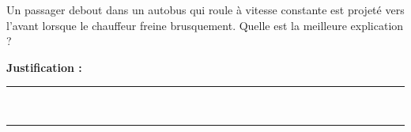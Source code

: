 Un passager debout dans un autobus qui roule à vitesse constante est projeté vers l'avant lorsque le chauffeur freine brusquement. Quelle est la meilleure explication ?

\choices

\noindent\textbf{Justification :} \hrulefill \\[2.5ex]
\rule{\linewidth}{0.4pt} \\[2.5ex]
\rule{\linewidth}{0.4pt}
\vfill
